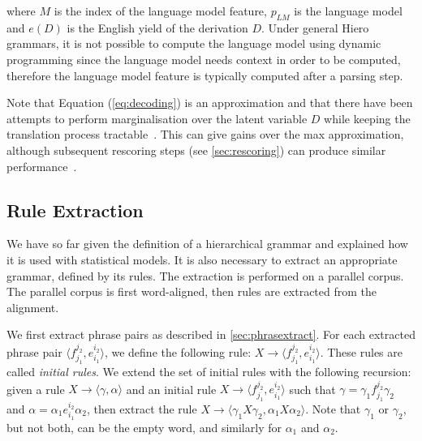     \noindent where $M$ is the index of the language model feature, $p_{LM}$ is the language model and $e(D)$ is the English
    yield of the derivation $D$. Under general Hiero grammars, it is not possible to compute the language model using dynamic programming since
    the language model needs context in order to be computed, therefore the language model feature is typically
    computed after a parsing step. %
    
    Note that Equation (\ref{eq:decoding}) is an approximation and that there have been attempts to perform marginalisation over the latent variable 
    $D$ while keeping the translation process tractable~\citep{blunsom-cohn-osborne:2008:ACL,degispert-iglesias-blackwood-banga-byrne:2010:CL}.
    This can give gains over the max approximation, although subsequent rescoring
    steps (see \autoref{sec:rescoring}) can produce similar performance~\citep{degispert-iglesias-blackwood-banga-byrne:2010:CL}.


  \subsection{Rule Extraction} \label{sec:hierruleextract}

  We have so far given the definition of a hierarchical grammar and explained how it is used with statistical models.
  It is also necessary to extract an appropriate grammar, defined by its rules. The extraction
  is performed on a parallel corpus. The parallel corpus is first word-aligned, then
  rules are extracted from the alignment.

  We first extract phrase pairs as described in \autoref{sec:phrasextract}.
  For each extracted phrase pair $\langle f_{j_1}^{j_2}, e_{i_1}^{i_2} \rangle$,
  we define the following
  rule: $X \rightarrow \langle f_{j_1}^{j_2},e_{i_1}^{i_2} \rangle$.
  These rules are called {\em initial rules}.
      We extend the set of initial rules with the following recursion: given a rule  $X \rightarrow \langle \gamma, \alpha \rangle$
      and an initial rule $X \rightarrow \langle f_{j_1}^{j_2},e_{i_1}^{i_2} \rangle$ such that $\gamma = \gamma_1 f_{j_1}^{j_2} \gamma_2$
      and $\alpha = \alpha_1 e_{i_1}^{i_2} \alpha_2$, then extract the rule $X \rightarrow \langle \gamma_1 X \gamma_2, \alpha_1 X \alpha_2 \rangle$.
      Note that $\gamma_1$ or $\gamma_2$, but not both, can be the empty word, and similarly for $\alpha_1$ and $\alpha_2$.


